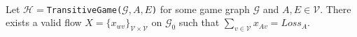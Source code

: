 \begin{lemma} \ \\
   \label{gameflow}
   Let $\mathcal{H} = $\texttt{TransitiveGame(}$\mathcal{G}, A, E$\texttt{)} for some game graph $\mathcal{G}$ and $A,
   E \in \mathcal{V}$. There exists a valid flow
   $X = \{x_{wv}\}_{\mathcal{V} \times \mathcal{V}}$ on $\mathcal{G}_0$ such that
   $\sum\limits_{v \in \mathcal{V}}x_{Av} = Loss_A$.
\end{lemma}
